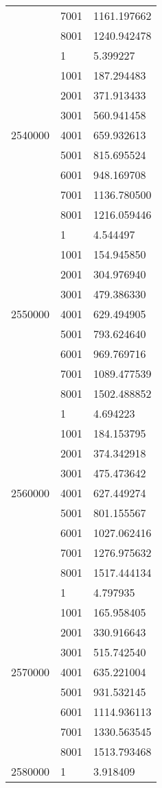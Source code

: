 \begin{table}[htb!]
\begin{tabular}{lll}
 & 7001 & 1161.197662 \\
 & 8001 & 1240.942478 \\
\multirow[c]{9}{*}{2540000} & 1 & 5.399227 \\
 & 1001 & 187.294483 \\
 & 2001 & 371.913433 \\
 & 3001 & 560.941458 \\
 & 4001 & 659.932613 \\
 & 5001 & 815.695524 \\
 & 6001 & 948.169708 \\
 & 7001 & 1136.780500 \\
 & 8001 & 1216.059446 \\
\multirow[c]{9}{*}{2550000} & 1 & 4.544497 \\
 & 1001 & 154.945850 \\
 & 2001 & 304.976940 \\
 & 3001 & 479.386330 \\
 & 4001 & 629.494905 \\
 & 5001 & 793.624640 \\
 & 6001 & 969.769716 \\
 & 7001 & 1089.477539 \\
 & 8001 & 1502.488852 \\
\multirow[c]{9}{*}{2560000} & 1 & 4.694223 \\
 & 1001 & 184.153795 \\
 & 2001 & 374.342918 \\
 & 3001 & 475.473642 \\
 & 4001 & 627.449274 \\
 & 5001 & 801.155567 \\
 & 6001 & 1027.062416 \\
 & 7001 & 1276.975632 \\
 & 8001 & 1517.444134 \\
\multirow[c]{9}{*}{2570000} & 1 & 4.797935 \\
 & 1001 & 165.958405 \\
 & 2001 & 330.916643 \\
 & 3001 & 515.742540 \\
 & 4001 & 635.221004 \\
 & 5001 & 931.532145 \\
 & 6001 & 1114.936113 \\
 & 7001 & 1330.563545 \\
 & 8001 & 1513.793468 \\
\multirow[c]{9}{*}{2580000} & 1 & 3.918409 \\

\end{tabular}
\end{table}
